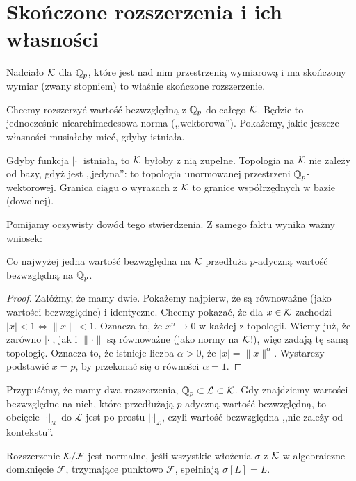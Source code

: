 \section{Skończone rozszerzenia i ich własności}
Nadciało  $\mathcal K$ dla $\mathbb Q_p$, które jest nad nim przestrzenią wymiarową i ma skończony wymiar (zwany stopniem) to właśnie skończone rozszerzenie.

Chcemy rozszerzyć wartość bezwzględną z $\mathbb Q_p$ do całego $\mathcal K$.
Będzie to jednocześnie niearchimedesowa norma (,,wektorowa'').
Pokażemy, jakie jeszcze własności musiałaby mieć, gdyby istniała.

\begin{fakt}
	Gdyby funkcja $|\cdot|$ istniała, to $\mathcal K$ byłoby z nią zupełne.
	Topologia na $\mathcal K$ nie zależy od bazy, gdyż jest ,,jedyna'': to topologia unormowanej przestrzeni $\mathbb Q_p$-wektorowej.
	Granica ciągu o wyrazach z $\mathcal K$ to granice współrzędnych w bazie (dowolnej).
\end{fakt}

Pomijamy oczywisty dowód tego stwierdzenia.
Z samego faktu wynika ważny wniosek:

\begin{fakt}
	Co najwyżej jedna wartość bezwzględna na $\mathcal K$ przedłuża $p$-adyczną wartość bezwzględną na $\mathbb Q_p$.
\end{fakt}

\begin{proof}
	Załóżmy, że mamy dwie.
	Pokażemy najpierw, że są równoważne (jako wartości bezwzględne) i identyczne.
	Chcemy pokazać, że dla $x\in \mathcal K$ zachodzi $|x|<1 \Leftrightarrow \|x\|<1$.
	Oznacza to, że $x^n \to 0$ w każdej z topologii.
	Wiemy już, że zarówno $|\cdot|$, jak i $\|\cdot\|$ są równoważne (jako normy na $\mathcal K$!), więc zadają tę samą topologię.
	Oznacza to, że istnieje liczba $\alpha > 0$, że $|x| = \|x\|^\alpha$.
	Wystarczy podstawić $x = p$, by przekonać się o równości $\alpha = 1$.
\end{proof}

Przypuśćmy, że mamy dwa rozszerzenia, $\mathbb Q_p \subset\mathcal  L \subset \mathcal K$.
Gdy znajdziemy wartości bezwzględne na nich, które przedłużają $p$-adyczną wartość bezwzględną, to obcięcie $|\cdot|_{\mathcal  K}$ do $\mathcal L$ jest po prostu $|\cdot|_{\mathcal L}$, czyli wartość bezwzględna ,,nie zależy od kontekstu''.

\begin{definicja}
	Rozszerzenie $\mathcal K / \mathcal F$ jest normalne, jeśli wszystkie włożenia $\sigma$ z $\mathcal K$ w algebraiczne domknięcie $\mathcal F$, trzymające punktowo $\mathcal F$, spełniają $\sigma[L] = L$.
\end{definicja}

